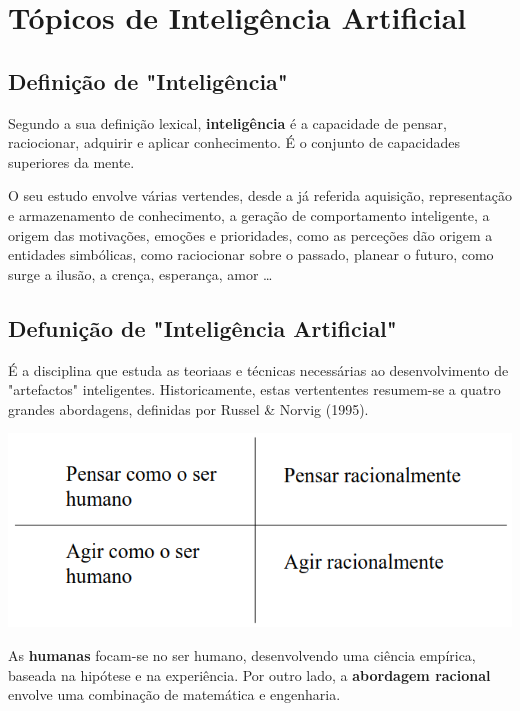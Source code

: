 \documentclass{article}
\begin{document}
\section{Tópicos de Inteligência Artificial}

\subsection{Definição de "Inteligência"}

Segundo a sua definição lexical, \textbf{inteligência} é a capacidade de pensar, raciocionar, adquirir e
aplicar conhecimento. É o conjunto de capacidades superiores da mente.

\vspace{2mm}

O seu estudo envolve várias vertendes, desde a já referida aquisição, representação e
armazenamento de conhecimento, a geração de comportamento inteligente, a origem das
motivações, emoções e prioridades, como as perceções dão origem a entidades simbólicas,
como raciocionar sobre o passado, planear o futuro, como surge a ilusão, a crença, esperança,
amor \dots

\pagebreak

\subsection{Defunição de "Inteligência Artificial"}

É a disciplina que estuda as teoriaas e técnicas necessárias ao desenvolvimento
de "artefactos" inteligentes. Historicamente, estas vertententes resumem-se a quatro grandes abordagens, definidas por
Russel \& Norvig (1995).

\begin{center}
  \includegraphics[scale=0.3]{6}
\end{center}

As \textbf{humanas} focam-se no ser humano, desenvolvendo uma ciência empírica, baseada na
hipótese e na experiência. Por outro lado, a \textbf{abordagem racional} envolve uma combinação de
matemática e engenharia.
\end{document}
